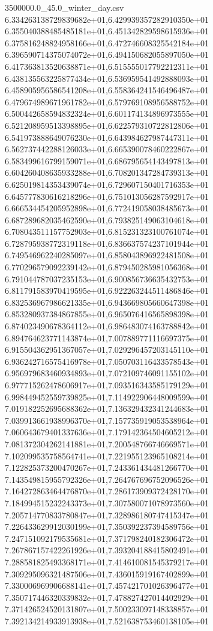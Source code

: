 \begin{filecontents*}{3500000.0_45.0_winter_day.csv}
6.334263138729839682e+01,6.429939357282910350e+01
6.355040388485485181e+01,6.451342829598615936e+01
6.375816248824958166e+01,6.472746608325542184e+01
6.396590714375074072e+01,6.494150682055897050e+01
6.417363813520638871e+01,6.515555017792212311e+01
6.438135563225877434e+01,6.536959541492888093e+01
6.458905956586541208e+01,6.558364241546496487e+01
6.479674989671961782e+01,6.579769108956588752e+01
6.500442658594832324e+01,6.601174134896973555e+01
6.521208959513398895e+01,6.622579310722812806e+01
6.541973888649076230e+01,6.643984627987447311e+01
6.562737442288126033e+01,6.665390078460222867e+01
6.583499616799159071e+01,6.686795654143497813e+01
6.604260408635933288e+01,6.708201347284739313e+01
6.625019814353439074e+01,6.729607150401716353e+01
6.645777830616218296e+01,6.751013056287592917e+01
6.666534454205952898e+01,6.772419058038485673e+01
6.687289682035462590e+01,6.793825149063104618e+01
6.708043511157752903e+01,6.815231323100761074e+01
6.728795938772319118e+01,6.836637574237101944e+01
6.749546962240285097e+01,6.858043896922481508e+01
6.770296579092239142e+01,6.879450285981056368e+01
6.791044787037235153e+01,6.900856736635432753e+01
6.811791583970419595e+01,6.922263244511486846e+01
6.832536967986621335e+01,6.943669805660647398e+01
6.853280937384867855e+01,6.965076416565898398e+01
6.874023490678364112e+01,6.986483074163788842e+01
6.894764623771143874e+01,7.007889771116697375e+01
6.915504362951367057e+01,7.029296457203145110e+01
6.936242716575416978e+01,7.050703116433578543e+01
6.956979683460934893e+01,7.072109746091155102e+01
6.977715262478606917e+01,7.093516343585179129e+01
6.998449452559739825e+01,7.114922906448009599e+01
7.019182252695688362e+01,7.136329432341244683e+01
7.039913661938996370e+01,7.157735919053538964e+01
7.060643679401337636e+01,7.179142364504605212e+01
7.081372304262141881e+01,7.200548766746669571e+01
7.102099535758564741e+01,7.221955123965108214e+01
7.122825373200470267e+01,7.243361434481266770e+01
7.143549815955792326e+01,7.264767696752096526e+01
7.164272863464476870e+01,7.286173909372428170e+01
7.184994515232243373e+01,7.307580071078973560e+01
7.205714770833780847e+01,7.328986180747415347e+01
7.226433629912030199e+01,7.350392237394589756e+01
7.247151092179535681e+01,7.371798240182306472e+01
7.267867157422261926e+01,7.393204188415802491e+01
7.288581825493368171e+01,7.414610081545379217e+01
7.309295096321487506e+01,7.436015919167402899e+01
7.330006969906688141e+01,7.457421701026396477e+01
7.350717446320339832e+01,7.478827427014402929e+01
7.371426524520131807e+01,7.500233097148338857e+01
7.392134214933913938e+01,7.521638753460138105e+01

\end{filecontents*}

